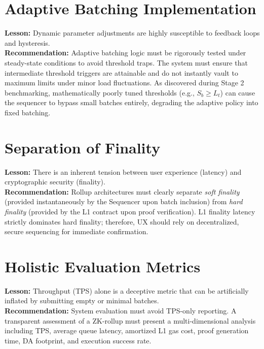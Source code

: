 \section{Adaptive Batching Implementation}
\textbf{Lesson:} Dynamic parameter adjustments are highly susceptible to feedback loops and hysteresis. \\
\textbf{Recommendation:} Adaptive batching logic must be rigorously tested under steady-state conditions to avoid threshold traps. The system must ensure that intermediate threshold triggers are attainable and do not instantly vault to maximum limits under minor load fluctuations. As discovered during Stage 2 benchmarking, mathematically poorly tuned thresholds (e.g., $S_b \ge L_t$) can cause the sequencer to bypass small batches entirely, degrading the adaptive policy into fixed batching.

\section{Separation of Finality}
\textbf{Lesson:} There is an inherent tension between user experience (latency) and cryptographic security (finality). \\
\textbf{Recommendation:} Rollup architectures must clearly separate \textit{soft finality} (provided instantaneously by the Sequencer upon batch inclusion) from \textit{hard finality} (provided by the L1 contract upon proof verification). L1 finality latency strictly dominates hard finality; therefore, UX should rely on decentralized, secure sequencing for immediate confirmation.

\section{Holistic Evaluation Metrics}
\textbf{Lesson:} Throughput (TPS) alone is a deceptive metric that can be artificially inflated by submitting empty or minimal batches. \\
\textbf{Recommendation:} System evaluation must avoid TPS-only reporting. A transparent assessment of a ZK-rollup must present a multi-dimensional analysis including TPS, average queue latency, amortized L1 gas cost, proof generation time, DA footprint, and execution success rate.